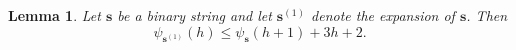 \documentclass[10pt,a4paper]{amsart}
\newtheorem{ex}{Example}
\newtheorem{lemma}{Lemma}
\begin{document}


\begin{lemma}\label{MainLemma}
Let $\mathbf{s}$ be a binary string and let $\mathbf{s}^{(1)}$ denote the expansion of $\mathbf{s}$. Then 
\begin{equation}
    \psi_{\mathbf{s}^{(1)}}(h) \le \psi_{\mathbf{s}}(h+1) + 3h + 2. 
\end{equation}

\end{lemma}
\end{document}
